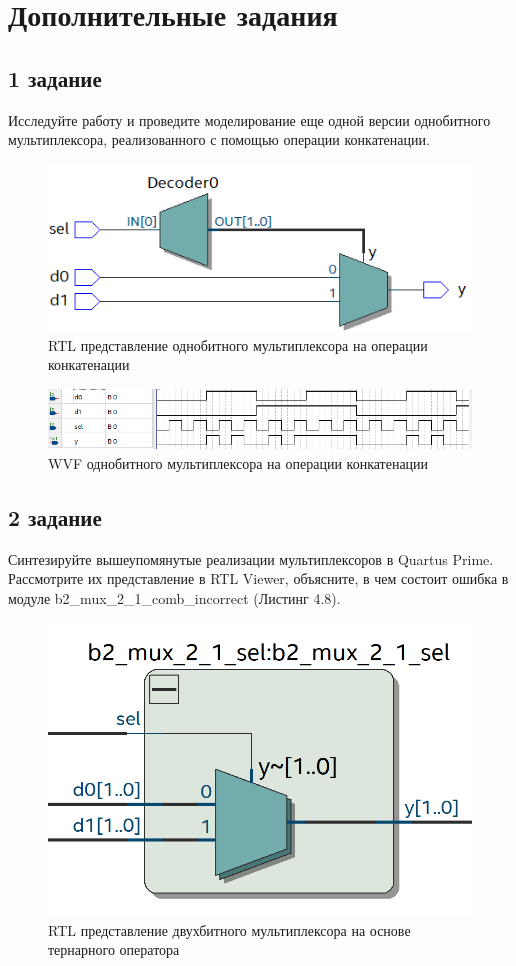 \documentclass[a4paper,14pt]{article}
\begin{document}
\section{Дополнительные задания}

\subsection{1 задание}
 
 Исследуйте работу и проведите моделирование еще одной версии однобитного
мультиплексора, реализованного с помощью операции конкатенации.


\begin{figure}[H]
	\centering
	\includegraphics[width=0.6\linewidth]{img/z1_rtl}
	\caption{RTL представление однобитного
		мультиплексора на операции конкатенации}
	\label{fig:z1_rtl}
\end{figure}

\begin{figure}[H]
	\centering
	\includegraphics[width=0.75\linewidth]{img/z1_wvf}
	\caption{WVF однобитного мультиплексора на операции конкатенации}
	\label{fig:z1_wvf}
\end{figure}

\subsection{2 задание}

Синтезируйте вышеупомянутые реализации мультиплексоров в Quartus Prime. Рассмотрите их представление в RTL Viewer, объясните, в чем состоит ошибка в модуле b2\_mux\_2\_1\_comb\_incorrect (Листинг 4.8).


\begin{figure}[H]
	\centering
	\includegraphics[width=0.6\linewidth]{img/z2_rtl_sel}
	\caption{RTL представление двухбитного мультиплексора на основе тернарного оператора}
	\label{fig:z2_rtl_sel}
\end{figure}
\end{document}
